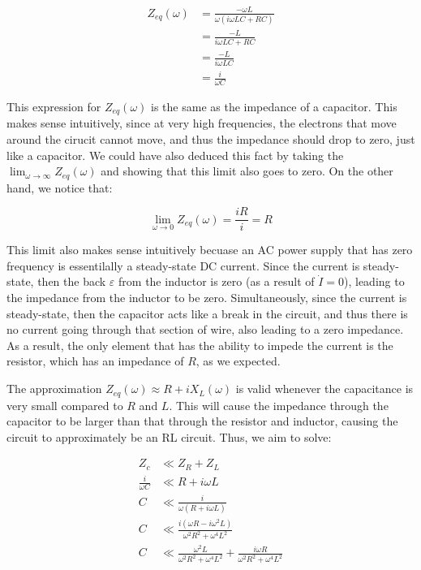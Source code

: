 \documentclass{article}
\theoremstyle{definition}
\numberwithin{equation}{section}
\numberwithin{definition}{section}
\begin{document}
\begin{align*}
    Z_{eq}(\omega) &= \frac{-\omega L}{\omega (i\omega LC + RC)}\\
    &= \frac{-L}{i\omega LC + RC}\\
    &= \frac{-L}{i\omega LC}\\
    &= \frac{i}{\omega C}
\end{align*}

This expression for $Z_{eq}(\omega)$ is the same as the impedance of a capacitor. This makes sense intuitively, since at very high frequencies, the electrons that move around the cirucit cannot move, and thus the impedance should drop to zero, just like a capacitor. We could have also deduced this fact by taking the $\lim_{\omega \to \infty} Z_{eq}(\omega)$ and showing that this limit also goes to zero. On the other hand, we notice that:

\[ \lim_{\omega \to 0} Z_{eq}(\omega) = \frac{iR}{i} = R\]

This limit also makes sense intuitively becuase an AC power supply that has zero frequency is essentilally a steady-state DC current. Since the current is steady-state, then the back $\varepsilon$ from the inductor is zero (as a result of $\dot I = 0$), leading to the impedance from the inductor to be zero. Simultaneously, since the current is steady-state, then the capacitor acts like a break in the circuit, and thus there is no current going through that section of wire, also leading to a zero impedance. As a result, the only element that has the ability to impede the current is the resistor, which has an impedance of $R$, as we expected.


The approximation $Z_{eq}(\omega) \approx R + iX_L(\omega)$ is valid whenever the capacitance is very small compared to $R$ and $L$. This will cause the impedance through the capacitor to be larger than that through the resistor and inductor, causing the circuit to approximately be an RL circuit. Thus, we aim to solve:

\begin{align*}
    Z_c &\ll Z_R + Z_L\\
    \frac{i}{\omega C} &\ll R + i\omega L\\
    C &\ll \frac{i}{\omega (R + i\omega L)}\\
    C &\ll \frac{i(\omega R - i\omega^2 L)}{\omega^2R^2 + \omega^4 L^2}\\
    C &\ll \frac{\omega^2 L}{\omega^2 R^2 + \omega^4 L^2} + \frac{i\omega R}{\omega^2R^2 + \omega^4L^2} 
\end{align*}
\end{document}
